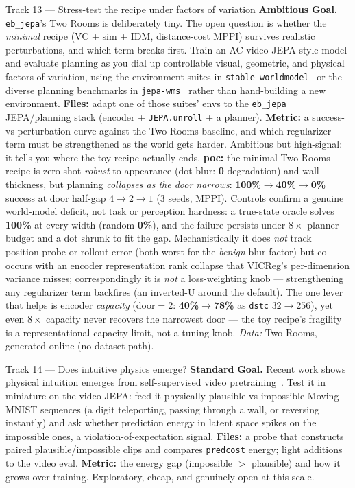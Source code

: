 \documentclass{article}
\newcommand{\code}[1]{\texttt{\small #1}}
\newcommand{\diffmed}{\colorbox{ebamber!18}{\textcolor{ebamber}{\small\bfseries Standard}}}
\newcommand{\diffhard}{\colorbox{ebred!15}{\textcolor{ebred}{\small\bfseries Ambitious}}}
\begin{document}
\begin{trackbox}{Track 13 --- Stress-test the recipe under factors of variation \hfill \diffhard{}}
\textbf{Goal.} \texttt{eb\_jepa}'s Two Rooms is deliberately tiny. The open question
is whether the \emph{minimal} recipe (VC + sim + IDM, distance-cost MPPI) survives
realistic perturbations, and which term breaks first. Train an AC-video-JEPA-style
model and evaluate planning as you dial up controllable visual, geometric, and
physical factors of variation, using the environment suites in
\texttt{stable-worldmodel}~\citep{stableworldmodel} or the diverse planning
benchmarks in \texttt{jepa-wms}~\citep{terver2026JEPAWMs} rather than hand-building a
new environment. \textbf{Files:} adapt one of those suites' envs to the
\code{eb\_jepa} JEPA/planning stack (encoder + \code{JEPA.unroll} + a planner).
\textbf{Metric:} a success-vs-perturbation curve against the Two Rooms baseline, and
which regularizer term must be strengthened as the world gets harder. Ambitious but
high-signal: it tells you where the toy recipe actually ends.
\smallskip
\textbf{poc:} the minimal Two Rooms recipe is zero-shot \emph{robust} to appearance
(dot blur: \textbf{0} degradation) and wall thickness, but planning \emph{collapses as the
door narrows}: \textbf{100\%$\to$40\%$\to$0\%} success at door half-gap $4\to2\to1$ (3 seeds,
MPPI). Controls confirm a genuine world-model deficit, not task or perception hardness: a
true-state oracle solves \textbf{100\%} at every width (random \textbf{0\%}), and the failure
persists under $8\times$ planner budget and a dot shrunk to fit the gap. Mechanistically it
does \emph{not} track position-probe or rollout error (both worst for the \emph{benign} blur
factor) but co-occurs with an encoder representation rank collapse that VICReg's
per-dimension variance misses; correspondingly it is \emph{not} a loss-weighting knob ---
strengthening any regularizer term backfires (an inverted-U around the default). The one
lever that helps is encoder \emph{capacity} (door$=$2: \textbf{40\%$\to$78\%} as \code{dstc}
$32\to256$), yet even $8\times$ capacity never recovers the narrowest door --- the toy
recipe's fragility is a representational-capacity limit, not a tuning knob.
\emph{Data:} Two Rooms, generated online (no dataset path).
\end{trackbox}

\begin{trackbox}{Track 14 --- Does intuitive physics emerge? \hfill \diffmed{}}
\textbf{Goal.} Recent work shows physical intuition emerges from self-supervised
video pretraining~\citep{garrido2025intuitivephysicsunderstandingemerges}. Test it
in miniature on the video-JEPA: feed it physically plausible vs impossible Moving
MNIST sequences (a digit teleporting, passing through a wall, or reversing
instantly) and ask whether prediction energy in latent space spikes on the
impossible ones, a violation-of-expectation signal. \textbf{Files:} a probe that
constructs paired plausible/impossible clips and compares \code{predcost} energy;
light additions to the video eval. \textbf{Metric:} the energy gap (impossible $>$
plausible) and how it grows over training. Exploratory, cheap, and genuinely
open at this scale.
\end{trackbox}
\end{document}
